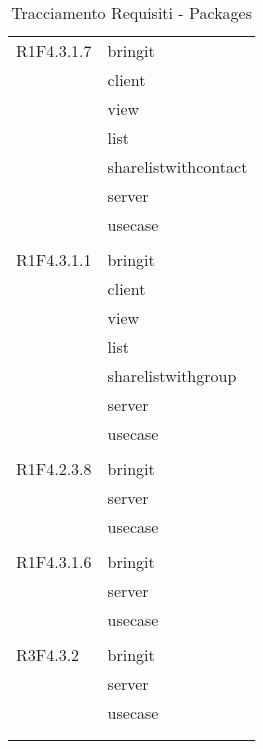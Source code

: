 \begin{center}
\begin{longtable}{|p{7cm}|p{7cm}|}
		R1F4.3.1.7 & bringit \\ & client \\ & view \\ & list \\ & sharelistwithcontact \\ & server \\ & usecase \\ & \\ \hline
		R1F4.3.1.1 & bringit \\ & client \\ & view \\ & list \\ & sharelistwithgroup \\ & server \\ & usecase \\ & \\ \hline
		R1F4.2.3.8 & bringit \\ & server \\ & usecase \\ & \\ \hline
		R1F4.3.1.6 & bringit \\ & server \\ & usecase \\ & \\ \hline
		R3F4.3.2 & bringit \\ & server \\ & usecase \\ & \\ \hline
	\caption[Tracciamento Requisiti - Packages]{Tracciamento Requisiti - Packages}
	\label{tabella: Tracciamento Requisiti - Packages}
	\end{longtable}
\end{center}
